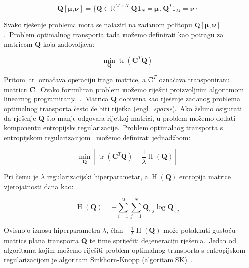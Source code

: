 \documentclass[diplomskirad]{fer}
\begin{document}
\begin{equation}
  \bm{Q}\left[ \bm{\mu}, \bm{\nu} \right] = \{ \bm{Q} \in \mathbb{R}_{+}^{M \times N} | \bm{Q} \bm{1}_N = \bm{\mu}\,, \bm{Q}^T \bm{1}_M = \bm{\nu} \}
  \label{eq:ot_polytope}
\end{equation}

Svako rješenje problema mora se nalaziti na zadanom politopu $\bm{Q}\left[ \bm{\mu}, \bm{\nu} \right]$.\ Problem optimalnog transporta tada možemo definirati kao potragu za matricom $\bm{Q}$ koja zadovoljava:

\begin{equation}
  \min_{\bm{Q}} \operatorname{tr}(\bm{C}^T \bm{Q})
  \label{eq:ot_basic}
\end{equation}

Pritom $\operatorname{tr}$ označava operaciju traga matrice, a $\bm{C}^T$ označava transponiranu matricu $\bm{C}$.\ Ovako formuliran problem možemo riješiti proizvoljnim algoritmom linearnog programiranja~\cite{dantzig2002linear}.\ 
Matrica $\bm{Q}$ dobivena kao rješenje zadanog problema optimalnog transporta često će biti rijetka (engl.\ \textit{sparse}).\ 
Ako želimo osigurati da rješenje $\bm{Q}$ što manje odgovara rijetkoj matrici, u problem možemo dodati komponentu entropijske regularizacije.\ 
Problem optimalnog transporta s entropijskom regularizacijom~\cite{genevay2019entropy} možemo definirati jednadžbom:

\begin{equation}
  \min_{\bm{Q}} \left[ \operatorname{tr}(\bm{C}^T \bm{Q}) - \frac{1}{\lambda} \operatorname{H}(\bm{Q}) \right]
  \label{eq:ot_with_entropy}
\end{equation}

Pri čemu je $\lambda$ regularizacijski hiperparametar, a $\operatorname{H}(\bm{Q})$ entropija matrice vjerojatnosti dana kao:

\begin{equation}
  \operatorname{H}(\bm{Q}) = -\sum_{i = 1}^{M} \sum_{j = 1}^{N} \bm{Q}_{i,j} \log \bm{Q}_{i,j}
  \label{eq:matrix_entropy}
\end{equation}

Ovisno o iznosu hiperparametra $\lambda$, član $- \frac{1}{\lambda} \operatorname{H}(\bm{Q})$ može potaknuti gustoću matrice plana transporta $\bm{Q}$ te time spriječiti degeneraciju rješenja.\
Jedan od algoritama kojim možemo riješiti problem optimalnog transporta s entropijskom regularizacijom je algoritam Sinkhorn-Knopp (algoritam SK)~\cite{knight2008sinkhorn}.\ 
\end{document}

